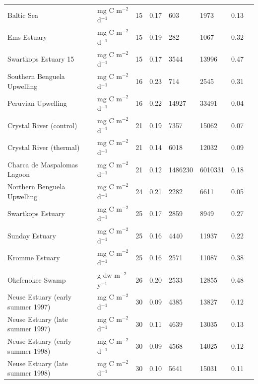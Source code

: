 \documentclass[article]{jss}
\begin{document}
\begin{table}[ht]
\begin{center}
\begin{tiny}
\begin{tabularx}{\textwidth}{llllllll}
      Baltic Sea & mg C m$^{-2}$ d$^{-1}$  &  15 & 0.17 & 603 & 1973 & 0.13 &   \citet{baird91} \\
      Ems Estuary & mg C m$^{-2}$ d$^{-1}$  &  15 & 0.19 & 282 & 1067 & 0.32 &  \citet{baird91} \\
      Swartkops Estuary  15 & mg C m$^{-2}$ d$^{-1}$  &  15 & 0.17 & 3544 & 13996 & 0.47 &   \citet{baird91} \\
      Southern Benguela Upwelling & mg C m$^{-2}$ d$^{-1}$  &  16 & 0.23 & 714 & 2545 & 0.31 & \citet{baird91} \\
      Peruvian Upwelling & mg C m$^{-2}$ d$^{-1}$  &  16 & 0.22 & 14927 & 33491 & 0.04 &  \citet{baird91} \\
      Crystal River (control) & mg C m$^{-2}$ d$^{-1}$  &  21 & 0.19 & 7357 & 15062 & 0.07 &  \citet{ulanowicz86} \\
      Crystal River (thermal) & mg C m$^{-2}$ d$^{-1}$  &  21 & 0.14 & 6018 & 12032 & 0.09 &  \citet{ulanowicz86} \\
      Charca de Maspalomas Lagoon & mg C m$^{-2}$ d$^{-1}$  &  21 & 0.12 & 1486230 & 6010331 & 0.18 &  \citet{almunia99} \\
      Northern Benguela Upwelling & mg C m$^{-2}$ d$^{-1}$  &  24 & 0.21 & 2282 & 6611 & 0.05 &  \citet{heymans00} \\
      Swartkops Estuary & mg C m$^{-2}$ d$^{-1}$  &  25 & 0.17 & 2859 & 8949 & 0.27 & \citet{scharler05} \\
      Sunday Estuary & mg C m$^{-2}$ d$^{-1}$  &  25 & 0.16 & 4440 & 11937 & 0.22 & \citet{scharler05} \\
      Kromme Estuary & mg C m$^{-2}$ d$^{-1}$  &  25 & 0.16 & 2571 & 11087 & 0.38 & \citet{scharler05} \\
      Okefenokee Swamp & g dw m$^{-2}$ y$^{-1}$  &  26 & 0.20 & 2533 & 12855 & 0.48 & \citet{whipple93} \\
      Neuse Estuary (early summer 1997) & mg C m$^{-2}$ d$^{-1}$  &  30 & 0.09 & 4385 & 13827 & 0.12 &  \citet{baird04} \\
      Neuse Estuary (late summer 1997)  & mg C m$^{-2}$ d$^{-1}$  &  30 & 0.11 & 4639 & 13035 & 0.13 &  \citet{baird04} \\
      Neuse Estuary (early summer 1998) & mg C m$^{-2}$ d$^{-1}$  &  30 & 0.09 & 4568 & 14025 & 0.12 &  \citet{baird04} \\
      Neuse Estuary (late summer 1998) & mg C m$^{-2}$ d$^{-1}$  &  30 & 0.10 & 5641 & 15031 & 0.11 &  \citet{baird04} \\

\end{tabularx}
\end{tiny}
\end{center}
\end{table}
\end{document}
